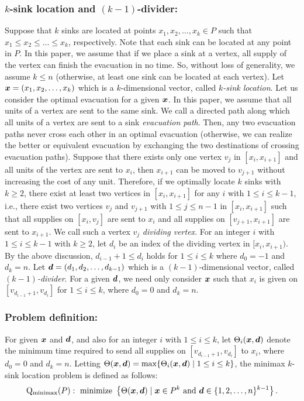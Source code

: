 \documentclass[a4paper]{llncs}
\newcommand{\bm}[1]{\mbox{\boldmath{$#1$}}}
\begin{document}
\subsubsection{$k$-sink location and $(k-1)$-divider:}
Suppose that $k$ sinks are located at points $x_1, x_2, \ldots, x_k \in P$ such that $x_1 \le x_2 \le \ldots \le x_k$, respectively.
Note that each sink can be located at any point in $P$.
In this paper, we assume that if we place a sink at a vertex, all supply of the vertex can finish the evacuation in no time.
So, without loss of generality, we assume $k \le n$
(otherwise, at least one sink can be located at each vertex). 
Let ${\bm x} = (x_1, x_2, \ldots, x_k)$ which is a $k$-dimensional vector, called {\it $k$-sink location}.
Let us consider the optimal evacuation for a given ${\bm x}$.
In this paper, we assume that all units of a vertex are sent to the same sink.
We call a directed path along which all units of a vertex are sent to a sink {\it evacuation path}.
Then, any two evacuation paths never cross each other in an optimal evacuation
(otherwise, we can realize the better or equivalent evacuation by exchanging the two destinations of crossing evacuation paths).
Suppose that there exists only one vertex $v_j$ in $[x_i, x_{i+1}]$ and all units of the vertex are sent to $x_i$,
then $x_{i+1}$ can be moved to $v_{j+1}$ without increasing the cost of any unit.
Therefore, if we optimally locate $k$ sinks with $k \ge 2$, there exist at least two vertices in $[x_i, x_{i+1}]$ for any $i$ with $1 \le i \le k-1$, i.e.,
there exist two vertices $v_j$ and $v_{j+1}$ with $1 \le j \le n-1$ in $[x_i, x_{i+1}]$
such that all supplies on $[x_i, v_j]$ are sent to $x_i$ and
all supplies on $[v_{j+1}, x_{i+1}]$ are sent to $x_{i+1}$.
We call such a vertex $v_j$ {\it dividing vertex}.
For an integer $i$ with $1 \le i \le k-1$ with $k \ge 2$, let $d_i$ be an index of the dividing vertex in $[x_i, x_{i+1})$.
By the above discussion, $d_{i-1}+1 \le d_i$ holds for $1 \le i \le k$ where $d_0 = -1$ and $d_k = n$.
Let ${\bm d} = (d_1, d_2, \ldots, d_{k-1})$ which is a $(k-1)$-dimensional vector, called {\it $(k-1)$-divider}.
For a given ${\bm d}$, we need only consider ${\bm x}$ such that $x_i $ is given on $[v_{d_{i-1}+1}, v_{d_i}]$ for $1 \le i \le k$, where $d_0 = 0$ and $d_k = n$.

\subsubsection{Problem definition:}
For given ${\bm x}$ and ${\bm d}$,
and also for an integer $i$ with $1 \le i \le k$, let $\Theta_i({\bm x}, {\bm d})$ denote the minimum time required to send all supplies on $[v_{d_{i-1}+1}, v_{d_i}]$ to $x_i$, where $d_0 = 0$ and $d_k = n$.
Letting $\Theta({\bm x}, {\bm d}) = \max \{ \Theta_i({\bm x}, {\bm d}) \mid 1 \le i \le k \}$, the minimax $k$-sink location problem is defined as follows:
\begin{eqnarray}
{\rm Q_{minimax}}(P): \ {\rm minimize} \ \left\{ \Theta({\bm x}, {\bm d}) \mid {\bm x} \in P^k \ {\rm and} \ {\bm d} \in \{ 1, 2, \ldots, n \}^{k-1} \right\}.
\label{pro1}
\end{eqnarray}
\end{document}
